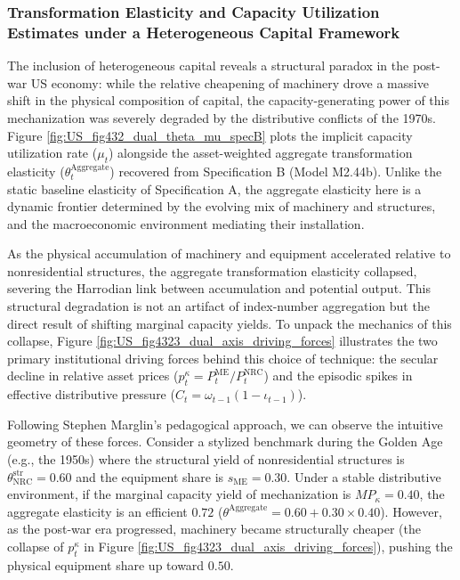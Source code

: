 \subsubsection{Transformation Elasticity and Capacity Utilization Estimates under a Heterogeneous Capital Framework}

The inclusion of heterogeneous capital reveals a structural paradox in the post-war US economy: while the relative cheapening of machinery drove a massive shift in the physical composition of capital, the capacity-generating power of this mechanization was severely degraded by the distributive conflicts of the 1970s. Figure \ref{fig:US_fig432_dual_theta_mu_specB} plots the implicit capacity utilization rate ($\mu_t$) alongside the asset-weighted aggregate transformation elasticity ($\theta_t^{\text{Aggregate}}$) recovered from Specification B (Model M2.44b). Unlike the static baseline elasticity of Specification A, the aggregate elasticity here is a dynamic frontier determined by the evolving mix of machinery and structures, and the macroeconomic environment mediating their installation.

As the physical accumulation of machinery and equipment accelerated relative to nonresidential structures, the aggregate transformation elasticity collapsed, severing the Harrodian link between accumulation and potential output. This structural degradation is not an artifact of index-number aggregation but the direct result of shifting marginal capacity yields. To unpack the mechanics of this collapse, Figure \ref{fig:US_fig4323_dual_axis_driving_forces} illustrates the two primary institutional driving forces behind this choice of technique: the secular decline in relative asset prices ($p_t^{\kappa} = P_t^{\text{ME}}/P_t^{\text{NRC}}$) and the episodic spikes in effective distributive pressure ($C_t = \omega_{t-1}(1-\iota_{t-1})$).

Following Stephen Marglin's pedagogical approach, we can observe the intuitive geometry of these forces. Consider a stylized benchmark during the Golden Age (e.g., the 1950s) where the structural yield of nonresidential structures is $\theta_{\text{NRC}}^{\text{str}} = 0.60$ and the equipment share is $s_{\text{ME}} = 0.30$. Under a stable distributive environment, if the marginal capacity yield of mechanization is $MP_{\kappa} = 0.40$, the aggregate elasticity is an efficient $0.72$ ($\theta^{\text{Aggregate}} = 0.60 + 0.30 \times 0.40$). However, as the post-war era progressed, machinery became structurally cheaper (the collapse of $p_t^{\kappa}$ in Figure \ref{fig:US_fig4323_dual_axis_driving_forces}), pushing the physical equipment share up toward $0.50$. 

